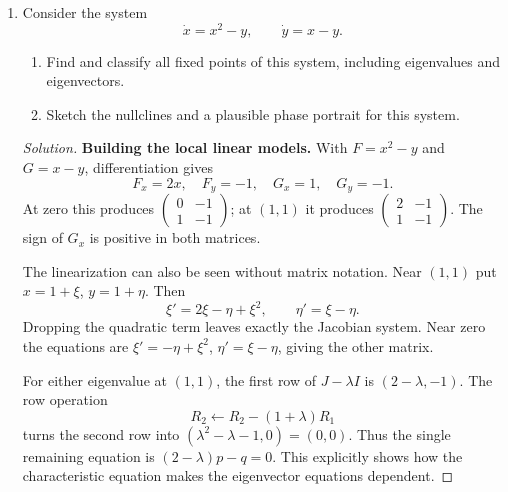\documentclass[10pt]{amsart}
\newenvironment{solution}
{\begin{proof}[Solution]}
{\end{proof}}
\begin{document}
\begin{enumerate}[label=\arabic*), leftmargin=*, itemsep=1em]
\begin{solution}
\begin{center}
\quad\qedhere\end{center}
    \end{solution}

    \item Consider the system
    \[
        \dot{x}=x^2-y, \qquad \dot{y}=x-y.
    \]
    \begin{enumerate}[label=(\alph*)]
        \item Find and classify all fixed points of this system, including eigenvalues and eigenvectors.
        \item Sketch the nullclines and a plausible phase portrait for this system.
    \end{enumerate}

    \begin{solution}

\noindent\textbf{Building the local linear models.} With $F=x^2-y$ and $G=x-y$, differentiation gives
\[
F_x=2x,\quad F_y=-1,\quad G_x=1,\quad G_y=-1.
\]
At zero this produces $\begin{pmatrix}0&-1\\1&-1\end{pmatrix}$; at $(1,1)$ it produces $\begin{pmatrix}2&-1\\1&-1\end{pmatrix}$. The sign of $G_x$ is positive in both matrices.

The linearization can also be seen without matrix notation. Near $(1,1)$ put $x=1+\xi$, $y=1+\eta$. Then
\[
\xi'=2\xi-\eta+\xi^2,\qquad \eta'=\xi-\eta.
\]
Dropping the quadratic term leaves exactly the Jacobian system. Near zero the equations are $\xi'=-\eta+\xi^2$, $\eta'=\xi-\eta$, giving the other matrix.

For either eigenvalue at $(1,1)$, the first row of $J-\lambda I$ is $(2-\lambda,-1)$. The row operation
\[
R_2\leftarrow R_2-(1+\lambda)R_1
\]
turns the second row into $(\lambda^2-\lambda-1,0)=(0,0)$. Thus the single remaining equation is $(2-\lambda)p-q=0$. This explicitly shows how the characteristic equation makes the eigenvector equations dependent.



\end{solution}
\end{enumerate}
\end{document}
